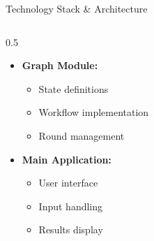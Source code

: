\documentclass[aspectratio=169]{beamer}
\begin{document}
\begin{frame}{Technology Stack \& Architecture}
\begin{columns}
\begin{column}{0.5\textwidth}
\begin{itemize}
                \item \textbf{Graph Module:}
                \begin{itemize}
                    \item State definitions
                    \item Workflow implementation
                    \item Round management
                \end{itemize}
                
                \item \textbf{Main Application:}
                \begin{itemize}
                    \item User interface
                    \item Input handling
                    \item Results display
                \end{itemize}
            \end{itemize}
        \end{column}
    \end{columns}
\end{frame}

\end{document}
